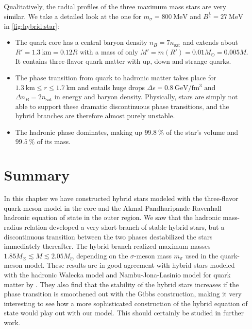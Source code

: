 Qualitatively, the radial profiles of the three maximum mass stars are very similar.
We take a detailed look at the one for $m_\sigma=\SI{800}{\mega\electronvolt}$ and $B^\frac14 = \SI{27}{\mega\electronvolt}$ in \cref{fig:hybrid:star}:
\begin{itemize}
\item The quark core has a central baryon density $n_B = 7 n_\text{sat}$ and extends about $R'=\SI{1.3}{\kilo\meter} = 0.12 R$ with a mass of only $M' = m(R') = 0.01 M_\odot = 0.005 M$.
      It contains three-flavor quark matter with up, down and strange quarks.
\item The phase transition from quark to hadronic matter takes place for $\SI{1.3}{\kilo\meter} \leq r \leq \SI{1.7}{\kilo\meter}$ and entails huge drops $\Delta\epsilon = \SI{0.8}{\giga\electronvolt\per\femto\meter\cubed}$ and $\Delta n_B = 2 n_\text{sat}$ in energy and baryon density.
      Physically, stars are simply not able to support these dramatic discontinuous phase transitions, and the hybrid branches are therefore almost purely unstable.
\item The hadronic phase dominates, making up $\SI{99.8}{\percent}$ of the star's volume and $\SI{99.5}{\percent}$ of its mass.
\end{itemize}

\section{Summary}

In this chapter we have constructed hybrid stars modeled with the three-flavor quark-meson model in the core
and the Akmal-Pandharipande-Ravenhall hadronic equation of state in the outer region.
We saw that the hadronic mass-radius relation developed a very short branch of stable hybrid stars,
but a discontinuous transition between the two phases destabilized the stars immediately thereafter.
The hybrid branch realized maximum masses $1.85 M_\odot \lesssim M \lesssim 2.05 M_\odot$ depending on the $\sigma$-meson mass $m_\sigma$ used in the quark-meson model.
These results are in good agreement with hybrid stars modeled with the hadronic Walecka model and Nambu-Jona-Lasinio model for quark matter by \cite{ref:hybrid_stars_njl}.
They also find that the stability of the hybrid stars increases if the phase transition is smoothened out with the Gibbs construction,
making it very interesting to see how a more sophisticated construction of the hybrid equation of state would play out with our model.
This should certainly be studied in further work.
